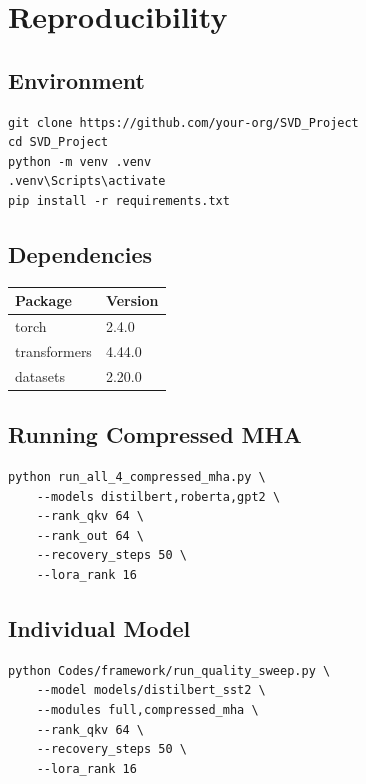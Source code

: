 \section{Reproducibility}

\subsection{Environment}

\begin{lstlisting}
git clone https://github.com/your-org/SVD_Project
cd SVD_Project
python -m venv .venv
.venv\Scripts\activate
pip install -r requirements.txt
\end{lstlisting}

\subsection{Dependencies}

\begin{table}[H]
\centering
\small
\begin{tabular}{ll}
\toprule
\textbf{Package} & \textbf{Version} \\
\midrule
torch & 2.4.0 \\
transformers & 4.44.0 \\
datasets & 2.20.0 \\
\bottomrule
\end{tabular}
\end{table}

\subsection{Running Compressed MHA}

\begin{lstlisting}
python run_all_4_compressed_mha.py \
    --models distilbert,roberta,gpt2 \
    --rank_qkv 64 \
    --rank_out 64 \
    --recovery_steps 50 \
    --lora_rank 16
\end{lstlisting}

\subsection{Individual Model}

\begin{lstlisting}
python Codes/framework/run_quality_sweep.py \
    --model models/distilbert_sst2 \
    --modules full,compressed_mha \
    --rank_qkv 64 \
    --recovery_steps 50 \
    --lora_rank 16
\end{lstlisting}

